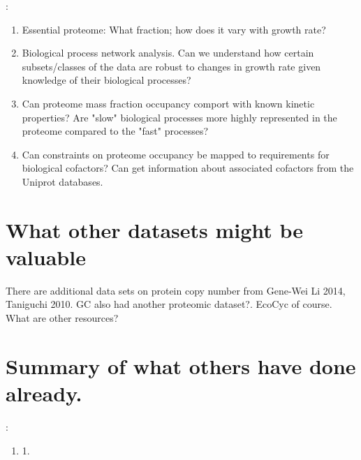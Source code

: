 \documentclass[preprint,10pt]{elsarticle}
\begin{document}
:
\begin{enumerate}
  \item Essential proteome: What fraction; how does it vary with growth rate?
  \item Biological process network analysis. Can we understand how certain
  subsets/classes of the data are robust to changes in growth rate given
  knowledge of their biological processes?
  \item Can proteome mass fraction occupancy comport with known kinetic
  properties? Are "slow" biological processes more highly represented in the
  proteome compared to the "fast" processes?
  \item Can constraints on proteome occupancy be mapped to requirements for
  biological cofactors? Can get information about associated cofactors from the
  Uniprot databases. 
\end{enumerate}

\section*{What other datasets might be valuable}

There are additional data sets on protein copy number from Gene-Wei Li 2014, Taniguchi 2010.
GC also had another proteomic dataset?. EcoCyc of course. What are other resources?

\section*{Summary of what others have done already.}
:
\begin{enumerate}
  \item 1.
\end{enumerate}
\end{document}
